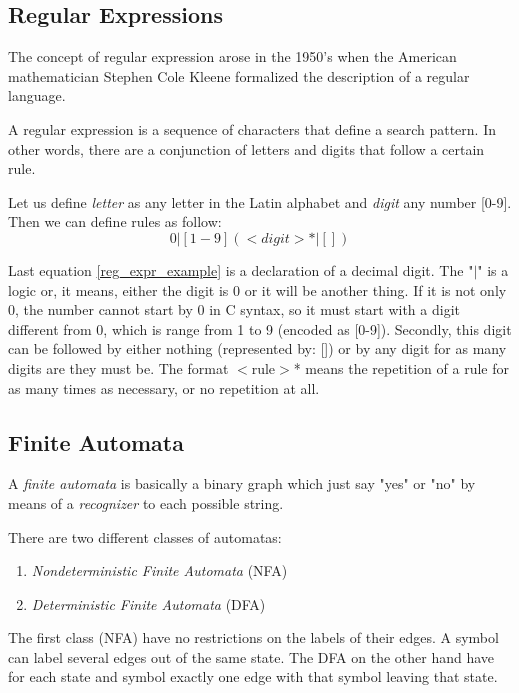 \documentclass[conference]{IEEEtran}
\theoremstyle{definition}
\begin{document}
\subsection{Regular Expressions}
The concept of regular expression arose in the 1950's when the American mathematician Stephen Cole Kleene formalized the description of a regular language.

A regular expression is a sequence of characters that define a search pattern. In other words, there are a conjunction of letters and digits that follow a certain rule.

Let us define \textit{letter} as any letter in the Latin alphabet and \textit{digit} any number [0-9]. Then we can define rules as follow: 
\begin{equation}
0 | [1-9] (<digit>* | [])\label{reg_expr_example}
\end{equation}

Last equation \ref{reg_expr_example} is a declaration of a decimal digit. The "$|$" is a logic or, it means, either the digit is 0 or it will be another thing. If it is not only 0, the number cannot start by 0 in C syntax, so it must start with a digit different from 0, which is range from 1 to 9 (encoded as [0-9]). Secondly, this digit can be followed by either nothing (represented by: []) or by any digit for as many digits are they must be. The format $<$rule$>$* means the repetition of a rule for as many times as necessary, or no repetition at all.

\subsection{Finite Automata}
A \textit{finite automata} is basically a binary graph which just say "yes" or "no" by means of a \textit{recognizer} to each possible string.

There are two different classes of automatas:
\begin{enumerate}
	\item \textit{Nondeterministic Finite Automata} (NFA)
	\item \textit{Deterministic Finite Automata} (DFA)
\end{enumerate}
The first class (NFA) have no restrictions on the labels of their edges. A symbol can label several edges out of the same state. The DFA on the other hand have for each state and symbol exactly one edge with that symbol leaving that state. 
\end{document}
